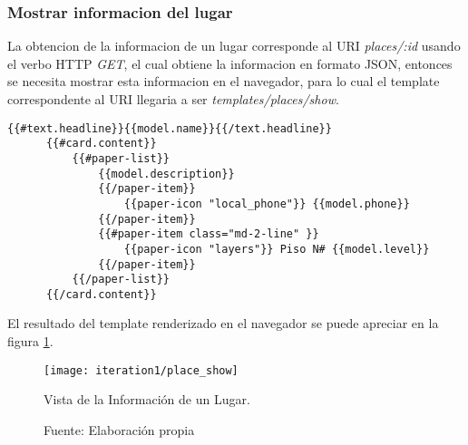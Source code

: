 \subsubsection{Mostrar informacion del lugar}
\label{subs:Mostrar informacion del lugar}

La obtencion de la informacion de un lugar corresponde al URI \emph{places/:id} usando el verbo HTTP \emph{GET}, el cual obtiene la informacion en formato JSON, entonces se necesita mostrar esta informacion en el navegador, para lo cual el template correspondente al URI llegaria a ser \emph{templates/places/show}.

\begin{center}
  \begin{lstlisting}[label=template_places_show,caption=Template para mostrar la informacion de un lugar]
      {{#text.headline}}{{model.name}}{{/text.headline}}
      {{#card.content}}
          {{#paper-list}}
              {{model.description}}
              {{/paper-item}}
                  {{paper-icon "local_phone"}} {{model.phone}}
              {{/paper-item}}
              {{#paper-item class="md-2-line" }}
                  {{paper-icon "layers"}} Piso N# {{model.level}}
              {{/paper-item}}
          {{/paper-list}}
      {{/card.content}}

  \end{lstlisting}
\end{center}

El resultado del template renderizado en el navegador se puede apreciar en la figura \ref{fig:place_show}.

\begin{figure}[H]
  \begin{center}
    \texttt{[image: iteration1/place\_show]}
    \caption{Vista de la Información de un Lugar.}
    \label{fig:place_show}
    \caption*{Fuente: Elaboración propia}
  \end{center}
\end{figure}





